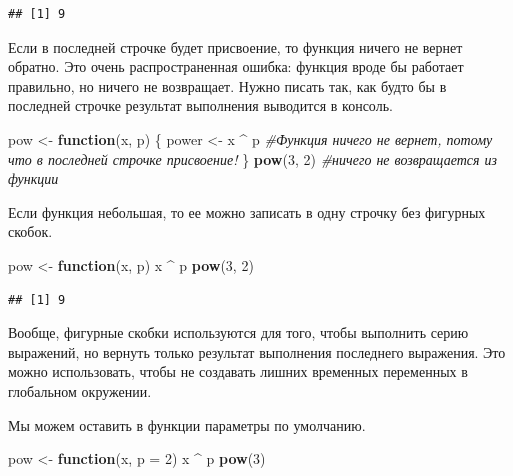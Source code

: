 \documentclass[]{book}
\newenvironment{Shaded}{\begin{snugshade}}{\end{snugshade}}
\newcommand{\KeywordTok}[1]{\textcolor[rgb]{0.13,0.29,0.53}{\textbf{#1}}}
\newcommand{\DataTypeTok}[1]{\textcolor[rgb]{0.13,0.29,0.53}{#1}}
\newcommand{\DecValTok}[1]{\textcolor[rgb]{0.00,0.00,0.81}{#1}}
\newcommand{\StringTok}[1]{\textcolor[rgb]{0.31,0.60,0.02}{#1}}
\newcommand{\CommentTok}[1]{\textcolor[rgb]{0.56,0.35,0.01}{\textit{#1}}}
\newcommand{\ControlFlowTok}[1]{\textcolor[rgb]{0.13,0.29,0.53}{\textbf{#1}}}
\newcommand{\OperatorTok}[1]{\textcolor[rgb]{0.81,0.36,0.00}{\textbf{#1}}}
\newcommand{\NormalTok}[1]{#1}
\begin{document}
\begin{verbatim}
## [1] 9
\end{verbatim}

Если в последней строчке будет присвоение, то функция ничего не вернет
обратно. Это очень распространенная ошибка: функция вроде бы работает
правильно, но ничего не возвращает. Нужно писать так, как будто бы в
последней строчке результат выполнения выводится в консоль.

\begin{Shaded}
\begin{Highlighting}[]
\NormalTok{pow <-}\StringTok{ }\ControlFlowTok{function}\NormalTok{(x, p) \{}
\NormalTok{  power <-}\StringTok{ }\NormalTok{x }\OperatorTok{^}\StringTok{ }\NormalTok{p }\CommentTok{#Функция ничего не вернет, потому что в последней строчке присвоение!}
\NormalTok{\}}
\KeywordTok{pow}\NormalTok{(}\DecValTok{3}\NormalTok{, }\DecValTok{2}\NormalTok{) }\CommentTok{#ничего не возвращается из функции}
\end{Highlighting}
\end{Shaded}

Если функция небольшая, то ее можно записать в одну строчку без фигурных
скобок.

\begin{Shaded}
\begin{Highlighting}[]
\NormalTok{pow <-}\StringTok{ }\ControlFlowTok{function}\NormalTok{(x, p) x }\OperatorTok{^}\StringTok{ }\NormalTok{p}
\KeywordTok{pow}\NormalTok{(}\DecValTok{3}\NormalTok{, }\DecValTok{2}\NormalTok{) }
\end{Highlighting}
\end{Shaded}

\begin{verbatim}
## [1] 9
\end{verbatim}

Вообще, фигурные скобки используются для того, чтобы выполнить серию
выражений, но вернуть только результат выполнения последнего выражения.
Это можно использовать, чтобы не создавать лишних временных переменных в
глобальном окружении.

Мы можем оставить в функции параметры по умолчанию.

\begin{Shaded}
\begin{Highlighting}[]
\NormalTok{pow <-}\StringTok{ }\ControlFlowTok{function}\NormalTok{(x, }\DataTypeTok{p =} \DecValTok{2}\NormalTok{) x }\OperatorTok{^}\StringTok{ }\NormalTok{p}
\KeywordTok{pow}\NormalTok{(}\DecValTok{3}\NormalTok{) }
\end{Highlighting}
\end{Shaded}
\end{document}
